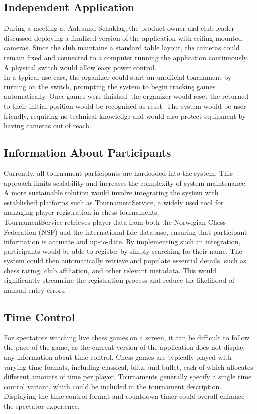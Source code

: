 \subsection{Independent Application}
During a meeting at Aalesund Schaklag, the product owner and club leader discussed deploying a finalized version of the application with ceiling-mounted cameras. Since the club maintains a standard table layout, the cameras could remain fixed and connected to a computer running the application continuously. A physical switch would allow easy power control. \\

In a typical use case, the organizer could start an unofficial tournament by turning on the switch, prompting the system to begin tracking games automatically. Once games were finished, the organizer would reset the returned to their initial position would be recognized as reset. The system would be user-friendly, requiring no technical knowledge and would also protect equipment by having cameras out of reach.

\subsection{Information About Participants}
Currently, all tournament participants are hardcoded into the system. This approach limits scalability and increases the complexity of system maintenance. A more sustainable solution would involve integrating the system with established platforms such as TournamentService, a widely used tool for managing player registration in chess tournaments. \\

TournamentService retrieves player data from both the Norwegian Chess Federation (NSF) and the international \gls{fide} database, ensuring that participant information is accurate and up-to-date.
By implementing such an integration, participants would be able to register by simply searching for their name. The system could then automatically retrieve and populate essential details, such as chess rating, club affiliation, and other relevant metadata. This would significantly streamline the registration process and reduce the likelihood of manual entry errors. \\

\subsection{Time Control}
For spectators watching live chess games on a screen, it can be difficult to follow the pace of the game, as the current version of the application does not display any information about time control. Chess games are typically played with varying time formats, including \gls{classical}, \gls{blitz}, and \gls{bullet}, each of which allocates different amounts of time per player. Tournaments generally specify a single time control variant, which could be included in the tournament description. Displaying the time control format and countdown timer could overall enhance the spectator experience. \\

